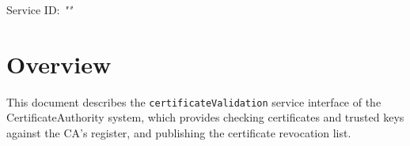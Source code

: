 \documentclass[a4paper]{arrowhead}
\begin{document}
\sloppy

\ArrowheadSetup

\begin{center}
  \vspace*{1cm}
  \huge{\arrowtitle}

  \vspace*{0.2cm}
  \LARGE{\arrowtype}
  \vspace*{1cm}

  \Large{Service ID: \textit{"\arrowid"}}

  \vspace*{\fill}


  \vspace*{1cm}
  \vspace*{\fill}

  \begin{abstract}
    This document describes the HTTP/1.1 protocol with TLS payload security and JSON payload encoding variant of the \texttt{certificate\allowbreak{}Validation} service of the CertificateAuthority system.
  \end{abstract}

  \vspace*{1cm}
\end{center}

\newpage

\tableofcontents
\newpage

\section{Overview}
\label{sec:overview}

This document describes the \texttt{certificate\allowbreak{}Validation} service interface of the CertificateAuthority system, which provides checking certificates and trusted keys against the CA's register, and publishing the certificate revocation list.
\end{document}
